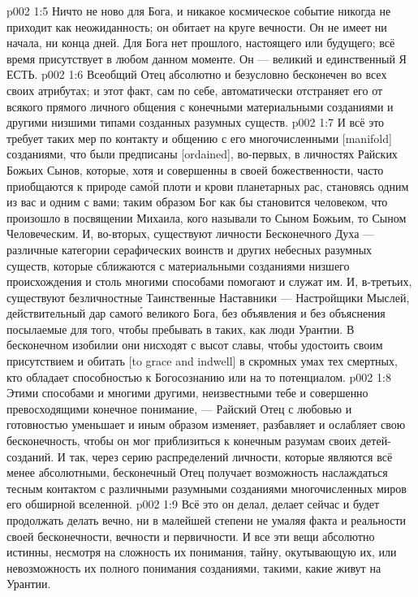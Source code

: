 \vs p002 1:5 Ничто не ново для Бога, и никакое космическое событие никогда не приходит как неожиданность; он обитает на круге вечности. Он не имеет ни начала, ни конца дней. Для Бога нет прошлого, настоящего или будущего; всё время присутствует в любом данном моменте. Он --- великий и единственный Я ЕСТЬ.
\vs p002 1:6 \pc Всеобщий Отец абсолютно и безусловно бесконечен во всех своих атрибутах; и этот факт, сам по себе, автоматически отстраняет его от всякого прямого личного общения с конечными материальными созданиями и другими низшими типами созданных разумных существ.
\vs p002 1:7 И всё это требует таких мер по контакту и общению с его многочисленными [manifold] созданиями, что были предписаны [ordained], во\hyp{}первых, в личностях Райских Божьих Сынов, которые, хотя и совершенны в своей божественности, часто приобщаются к природе сам\'ой плоти и крови планетарных рас, становясь одним из вас и одним с вами; таким образом Бог как бы становится человеком, что произошло в посвящении Михаила, кого называли то Сыном Божьим, то Сыном Человеческим. И, во\hyp{}вторых, существуют личности Бесконечного Духа --- различные категории серафических воинств и других небесных разумных существ, которые сближаются с материальными созданиями низшего происхождения и столь многими способами помогают и служат им. И, в\hyp{}третьих, существуют безличностные Таинственные Наставники --- Настройщики Мыслей, действительный дар самог\'о великого Бога, без объявления и без объяснения посылаемые для того, чтобы пребывать в таких, как люди Урантии. В бесконечном изобилии они нисходят с высот славы, чтобы удостоить своим присутствием и обитать [to grace and indwell] в скромных умах тех смертных, кто обладает способностью к Богосознанию или на то потенциалом.
\vs p002 1:8 Этими способами и многими другими, неизвестными тебе и совершенно превосходящими конечное понимание, --- Райский Отец с любовью и готовностью уменьшает и иным образом изменяет, разбавляет и ослабляет свою бесконечность, чтобы он мог приблизиться к конечным разумам своих детей\hyp{}созданий. И так, через серию распределений личности, которые являются всё менее абсолютными, бесконечный Отец получает возможность наслаждаться тесным контактом с различными разумными созданиями многочисленных миров его обширной вселенной.
\vs p002 1:9 Всё это он делал, делает сейчас и будет продолжать делать вечно, ни в малейшей степени не умаляя факта и реальности своей бесконечности, вечности и первичности. И все эти вещи абсолютно истинны, несмотря на сложность их понимания, тайну, окутывающую их, или невозможность их полного понимания созданиями, такими, какие живут на Урантии.
